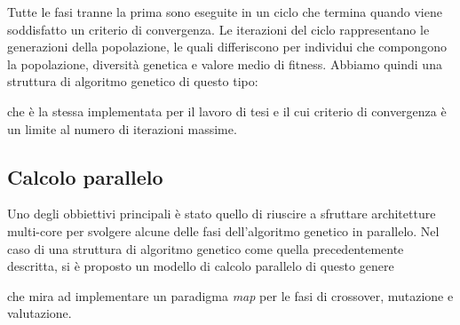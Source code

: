 Tutte le fasi tranne la prima sono eseguite in un ciclo che termina quando
viene soddisfatto un criterio di convergenza. Le iterazioni del ciclo
rappresentano le generazioni della popolazione, le quali differiscono per
individui che compongono la popolazione, diversità genetica e valore medio di
fitness. Abbiamo quindi una struttura di algoritmo genetico di questo tipo:

\begin{center}
	
\end{center}

che è la stessa implementata per il lavoro di tesi e il cui criterio di
convergenza è un limite al numero di iterazioni massime.

\subsection{Calcolo parallelo}

Uno degli obbiettivi principali è stato quello di riuscire a sfruttare
architetture multi-core per svolgere alcune delle fasi dell'algoritmo genetico
in parallelo. Nel caso di una struttura di algoritmo genetico come quella
precedentemente descritta, si è proposto un modello di calcolo parallelo di
questo genere

\begin{center}
	
\end{center}

che mira ad implementare un paradigma \textit{map} per le fasi di crossover,
mutazione e valutazione.

